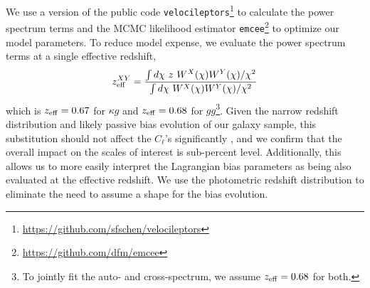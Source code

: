 We use a version of the public code \texttt{velocileptors}\footnote{\url{https://github.com/sfschen/velocileptors}} \citep{velocileptors} to calculate the power spectrum terms and the MCMC likelihood estimator \texttt{emcee}\footnote{\url{https://github.com/dfm/emcee}} \citep{emcee} to optimize our model parameters. 
To reduce model expense, we evaluate the power spectrum terms at a single effective redshift,
\begin{equation}
    z_{\rm eff}^{XY} = \frac{\int d\chi \ z \ W^{X}(\chi)W^{Y}(\chi)/\chi^2}{\int d\chi \ W^{X}(\chi)W^{Y}(\chi)/\chi^2}
\end{equation}
which is $z_{\rm eff} = 0.67$ for $\kappa g$ and $z_{\rm eff} = 0.68$ for $gg$\footnote{To jointly fit the auto- and cross-spectrum, we assume $z_{\rm eff} = 0.68$ for both.}. Given the narrow redshift distribution and likely passive bias evolution of our galaxy sample, this substitution should not affect the $C_{\ell}$'s significantly \citep{Modi++17}, and we confirm that the overall impact on the scales of interest is sub-percent level. Additionally, this allows us to more easily interpret the Lagrangian bias parameters as being also evaluated at the effective redshift. We use the photometric redshift distribution to eliminate the need to assume a shape for the bias evolution.

